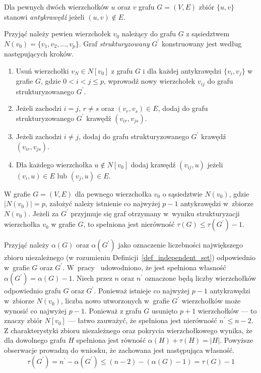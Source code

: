 \par{
  \begin{definition}
    Dla pewnych dwóch wierzchołków $u$ oraz $v$ grafu $G=(V, E)$ zbiór $\{u, v\}$ stanowi \emph{antykrawędź} jeżeli $(u, v) \notin E$.
  \end{definition}

  Przyjąć należy pewien wierzchołek $v_0$ należący do grafu $G$ z sąsiedztwem $N(v_0)=\{v_1, v_2, \ldots, v_p\}$.
  Graf \emph{strukturyzowany} $G^\prime$ konstruowany jest według następujących kroków.
  \begin{enumerate}
    \item Usuń wierzchołki $v_N \in N[v_0]$ z grafu $G$ i dla każdej antykrawędzi $\{v_i, v_j\}$ w grafie $G$, gdzie $0 < i < j \leq p$, wprowadź nowy wierzchołek $v_{ij}$ do grafu strukturyzowanego $G^\prime$.
    \item Jeżeli zachodzi $i=j$, $r\neq s$ oraz $(v_r, v_s) \in E$, dodaj do grafu strukturyzowanego $G^\prime$ krawędź $(v_{ir}, v_{js})$.
    \item Jeżeli zachodzi $i \neq j$, dodaj do grafu strukturyzowanego $G^\prime$ krawędź $(v_{ir}, v_{js})$.
    \item Dla każdego wierzchołka $u \notin N[v_0]$ dodaj krawędź $(v_{ij}, u)$ jeżeli $(v_i, u) \in E$ lub $(v_j, u) \in E$.
  \end{enumerate}
  \begin{theorem}
    W grafie $G=(V, E)$ dla pewnego wierzchołka $v_0$ o sąsiedztwie $N(v_0)$, gdzie $|N(v_0)|=p$, założyć należy istnienie co najwyżej $p-1$ antykrawędzi w~zbiorze $N(v_0)$.
    Jeżeli za $G^\prime$ przyjmuje się graf otrzymany w~wyniku strukturyzacji wierzchołka $v_0$ w grafie $G$, to spełniona jest nierówność $\tau(G) \leq \tau(G^\prime) - 1$.
  \end{theorem}
  \begin{bproof}
    Przyjąć należy $\alpha(G)$ oraz $\alpha(G^\prime)$ jako oznaczenie liczebności największego zbioru niezależnego (w rozumieniu Definicji~\ref{def_independent_set}) odpowiednio w~grafie $G$ oraz $G^\prime$.
    W~pracy~\cite{Ebengger:1984} udowodniono, że jest spełniona własność $\alpha(G^\prime)=\alpha(G) - 1$.
    Niech przez $n$ oraz $n^\prime$ oznaczone będą liczby wierzchołków odpowiednio grafu $G$ oraz $G^\prime$.
    Ponieważ istnieje co najwyżej $p - 1$ antykrawędzi w~zbiorze $N(v_0)$, liczba nowo utworzonych w~grafie $G^\prime$ wierzchołków może wynosić co najwyżej $p - 1$.
    Ponieważ z grafu $G$ usunięto $p+1$ wierzchołków --- to znaczy zbiór $N[v_0]$ --- łatwo zauważyć, że spełniona jest nierówność $n^\prime \leq n-2$.
    Z charakterystyki zbioru niezależnego oraz pokrycia wierzchołkowego wynika, że dla dowolnego grafu $H$ spełniona jest równość $\alpha(H)+\tau(H)=|H|$.
    Powyższe obserwacje prowadzą do wniosku, że zachowana jest następująca własność.
    \[\tau(G^\prime)=n^\prime-\alpha(G^\prime)\leq (n-2)-(\alpha(G)-1)=\tau(G)-1\]
  \end{bproof}
}
